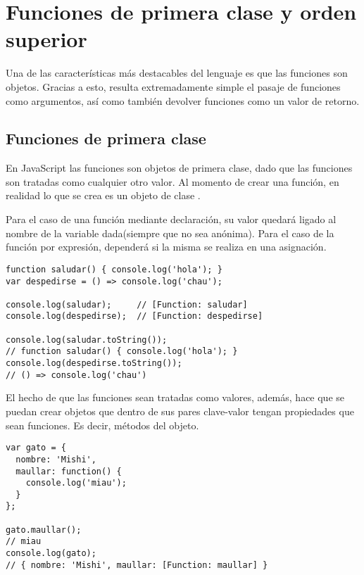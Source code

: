 \section{Funciones de primera clase y orden superior}

Una de las características más destacables del lenguaje es que las funciones son objetos. Gracias a esto, resulta extremadamente simple el pasaje de funciones como argumentos, así como también devolver funciones como un valor de retorno.

\subsection{Funciones de primera clase}

En JavaScript las funciones son objetos de primera clase, dado que las funciones son tratadas como cualquier otro valor. Al momento de crear una función, en realidad lo que se crea es un objeto de clase .

Para el caso de una función mediante declaración, su valor quedará ligado al nombre de la variable dada(siempre que no sea anónima). Para el caso de la función por expresión, dependerá si la misma se realiza en una asignación.

\begin{lstlisting}[title={Analizando el valor de una función}]
function saludar() { console.log('hola'); }
var despedirse = () => console.log('chau');

console.log(saludar);     // [Function: saludar]
console.log(despedirse);  // [Function: despedirse]

console.log(saludar.toString());  
// function saludar() { console.log('hola'); }
console.log(despedirse.toString()); 
// () => console.log('chau')
\end{lstlisting}

El hecho de que las funciones sean tratadas como valores, además, hace que se puedan crear objetos que dentro de sus pares clave-valor tengan propiedades que sean funciones. Es decir, métodos del objeto.

\begin{lstlisting}[title={Asignando una función como valor de una propiedad a un objeto}]
var gato = {
  nombre: 'Mishi',
  maullar: function() {
    console.log('miau');
  }
};

gato.maullar();   
// miau
console.log(gato);  
// { nombre: 'Mishi', maullar: [Function: maullar] }
\end{lstlisting}

